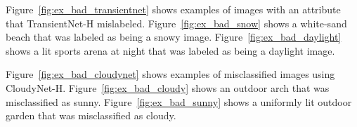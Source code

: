 \documentclass[10pt,twocolumn,letterpaper]{article}
\newcommand{\todo}[1]{\textcolor{red}{todo: {\em #1}}}
\newcommand{\figref}[1]{Figure~\ref{fig:#1}}
\begin{document}
\figref{ex_bad_transientnet} shows examples of images with an attribute that
TransientNet-H mislabeled.  \figref{ex_bad_snow} shows a white-sand beach that
was labeled as being a snowy image.  \figref{ex_bad_daylight} shows a lit
sports arena at night that was labeled as being a daylight image.

\figref{ex_bad_cloudynet} shows examples of misclassified images using
CloudyNet-H.  \figref{ex_bad_cloudy} shows an outdoor arch that was
misclassified as sunny.  \figref{ex_bad_sunny} shows a uniformly lit outdoor
garden that was misclassified as cloudy.



%

\end{document}
